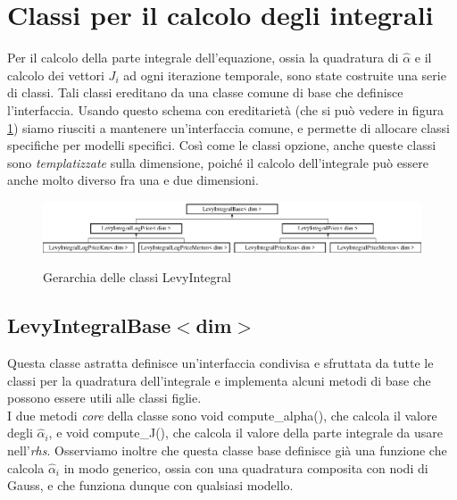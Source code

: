 \documentclass[a4paper,10pt]{report}
\theoremstyle{plain}
\theoremstyle{definition}
\theoremstyle{remark}
\begin{document}
\section{Classi per il calcolo degli integrali}
Per il calcolo della parte integrale dell'equazione, ossia la quadratura di $\hat{\alpha}$ e il calcolo dei vettori $J_i$ ad ogni iterazione temporale, sono state costruite una serie di classi. Tali classi ereditano da una classe comune di base che definisce l'interfaccia. Usando questo schema con ereditarietà (che si può vedere in figura \ref{fig:levybase}) siamo riusciti a mantenere un'interfaccia comune, e permette di allocare classi specifiche per modelli specifici. Cos\`i come le classi opzione, anche queste classi sono \emph{templatizzate} sulla dimensione, poiché il calcolo dell'integrale può essere anche molto diverso fra una e due dimensioni.
\begin{figure}[h!]
\begin{center}
\includegraphics[width=12cm]{img/classLevyIntegralBase.eps}
\label{fig:levybase}
\caption{Gerarchia delle classi LevyIntegral}
\end{center}
\end{figure}
\subsection{\textsf{LevyIntegralBase$<$dim$>$}}
Questa classe astratta definisce un'interfaccia condivisa e sfruttata da tutte le classi per la quadratura dell'integrale e implementa alcuni metodi di base che possono essere utili alle classi figlie.\\
I due metodi \emph{core} della classe sono \textsf{void compute\_alpha()}, che calcola il valore degli $\hat{\alpha}_i$, e \textsf{void compute\_J()}, che calcola il valore della parte integrale da usare nell'\emph{rhs}. Osserviamo inoltre che questa classe base definisce già una funzione che calcola $\hat{\alpha}_i$ in modo generico, ossia con una quadratura composita con nodi di Gauss, e che funziona dunque con qualsiasi modello.
\end{document}

